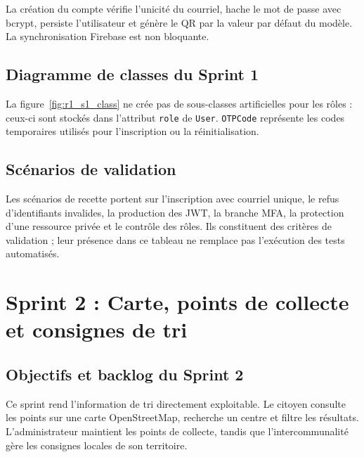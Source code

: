 \label{fig:r1_s1_seq_auth}

La création du compte vérifie l'unicité du courriel, hache le mot de passe avec bcrypt, persiste l'utilisateur et génère le QR par la valeur par défaut du modèle. La synchronisation Firebase est non bloquante.

\label{fig:r1_s1_seq_signup}

\subsection{Diagramme de classes du Sprint 1}

La figure~\ref{fig:r1_s1_class} ne crée pas de sous-classes artificielles pour les rôles : ceux-ci sont stockés dans l'attribut \texttt{role} de \texttt{User}. \texttt{OTPCode} représente les codes temporaires utilisés pour l'inscription ou la réinitialisation.

\label{fig:r1_s1_class}

\subsection{Scénarios de validation}

Les scénarios de recette portent sur l'inscription avec courriel unique, le refus d'identifiants invalides, la production des JWT, la branche MFA, la protection d'une ressource privée et le contrôle des rôles. Ils constituent des critères de validation ; leur présence dans ce tableau ne remplace pas l'exécution des tests automatisés.

\section{Sprint 2 : Carte, points de collecte et consignes de tri}
\label{sec:r1_sprint2}

\subsection{Objectifs et backlog du Sprint 2}

Ce sprint rend l'information de tri directement exploitable. Le citoyen consulte les points sur une carte OpenStreetMap, recherche un centre et filtre les résultats. L'administrateur maintient les points de collecte, tandis que l'intercommunalité gère les consignes locales de son territoire.

